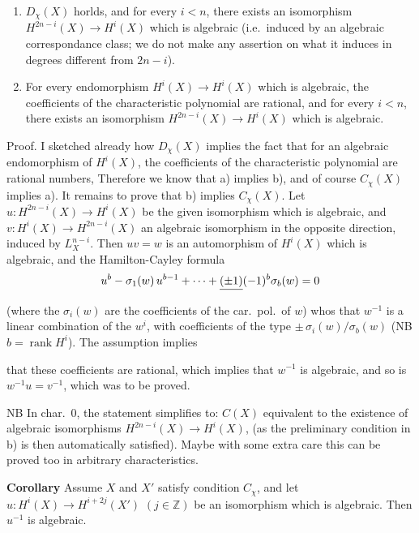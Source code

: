 \documentclass[11pt,a4paper]{article}
\begin{document}
\begin{enumerate}
\item[a)] $D_{\chi}(X)$ horlds, and for every $i < n$, there exists an
isomorphism $H^{2n-i}(X) \to H^{i}(X)$ which is algebraic (i.e.\ induced by an
algebraic correspondance class; we do not make any assertion on what it induces
in degrees different from $2n-i$).
\item[b)] For every endomorphism $H^{i}(X) \to H^{i}(X)$ which is algebraic, the
coefficients of the characteristic polynomial are rational, and for every
$i < n$, there exists an isomorphism $H^{2n-i}(X) \to H^{i}(X)$ which is
algebraic.
\end{enumerate}

Proof. I sketched already how $D_{\chi}(X)$ implies the fact that for an
algebraic endomorphism of $H^{i}(X)$, the coefficients of the characteristic
polynomial are rational numbers, Therefore we know that a) implies b), and of course
$C_{\chi}(X)$ implies a). It remains to prove that b) implies $C_{\chi}(X)$. Let
$u : H^{2n-i}(X) \to H^{i}(X)$ be the given isomorphism which is algebraic, and
$v : H^{i}(X) \to H^{2n-i}(X)$ an algebraic isomorphism in the opposite
direction, induced by $L_{X}^{n-i}$. Then $uv = w$ is an automorphism of
$H^{i}(X)$ which is algebraic, and the Hamilton-Cayley formula
\[
  u^{b} - \sigma_{1}(w)\,u^{b-1} + \dots + \struck{(\pm 1)} (-1)^{b}\sigma_{b}(w) = 0
\]
(where the $\sigma_{i}(w)$ are the coefficients of the car.\ pol.\ of $w$) whos
that $w^{-1}$ is a linear combination of the $w^{i}$, with coefficients of the
type $\pm\,\sigma_{i}(w)/\sigma_{b}(w)$ (NB $b = \operatorname{rank} H^{i}$). The
assumption implies


that these coefficients are rational, which implies that $w^{-1}$ is algebraic,
and so is $w^{-1}u = v^{-1}$, which was to be proved.

NB In char.\ $0$,  the statement simplifies to: $C(X)$ equivalent
to the existence of algebraic isomorphisms $H^{2n-i}(X) \to H^{i}(X)$, (as the
preliminary condition in b) is then automatically satisfied). Maybe with some
extra care this can be proved too in arbitrary characteristics.

\textbf{Corollary} Assume $X$ and $X'$ satisfy condition $C_{\chi}$, and let
$u : H^{i}(X) \to H^{i+2j}(X')$ $(j \in \mathbb{Z})$ be an isomorphism which is
algebraic. Then $u^{-1}$ is algebraic.
\end{document}
